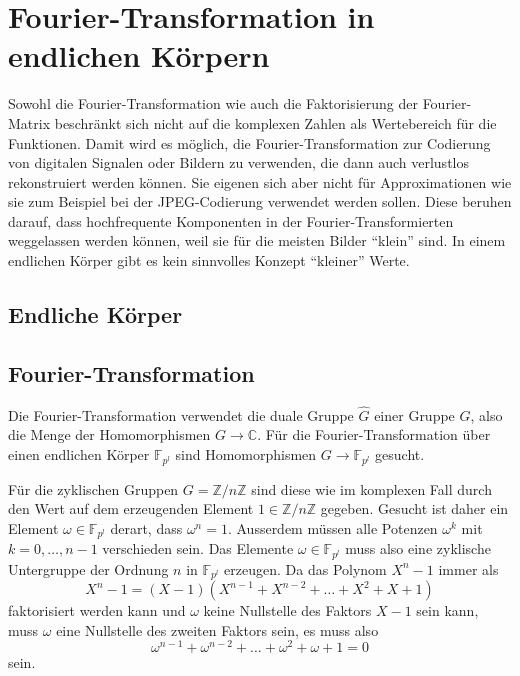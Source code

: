 %
%
%
\section{Fourier-Transformation in endlichen Körpern
\label{buch:diskret:section:koerper}}
Sowohl die Fourier-Transformation wie auch die Faktorisierung
der Fourier-Matrix beschränkt sich nicht auf die komplexen Zahlen
als Wertebereich für die Funktionen.
Damit wird es möglich, die Fourier-Transformation zur Codierung von
digitalen Signalen oder Bildern zu verwenden, die dann auch verlustlos
rekonstruiert werden können.
Sie eigenen sich aber nicht für Approximationen wie sie zum Beispiel
bei der JPEG-Codierung verwendet werden sollen.
Diese beruhen darauf, dass hochfrequente Komponenten in der
Fourier-Transformierten weggelassen werden können, weil sie für die
meisten Bilder ``klein'' sind.
In einem endlichen Körper gibt es kein sinnvolles Konzept ``kleiner''
Werte.

%
%
\subsection{Endliche Körper
\label{buch:diskret:koerper:subsection:koerper}}

%
%
\subsection{Fourier-Transformation
\label{buch:diskret:koeper:subsection:fourier}}
Die Fourier-Transformation verwendet die duale Gruppe $\hat{G}$ einer
Gruppe $G$, also die Menge der Homomorphismen $G\to \mathbb{C}$.
Für die Fourier-Transformation über einen endlichen Körper
$\mathbb{F}_{p^l}$ sind Homomorphismen
\(
G \to \mathbb{F}_{p^l}
\)
gesucht.

Für die zyklischen Gruppen $G=\mathbb{Z}/n\mathbb{Z}$ sind diese wie
im komplexen Fall durch den Wert auf dem erzeugenden Element
$1\in\mathbb{Z}/n\mathbb{Z}$ gegeben.
Gesucht ist daher ein Element $\omega\in\mathbb{F}_{p^l}$ derart,
dass $\omega^n=1$.
Ausserdem müssen alle Potenzen $\omega^k$ mit $k=0,\dots,n-1$
verschieden sein.
Das Elemente $\omega\in\mathbb{F}_{p^l}$ muss also eine
zyklische Untergruppe der Ordnung $n$ in $\mathbb{F}_{p^l}$ 
erzeugen.
Da das Polynom $X^n-1$ immer als
\[
X^n-1
=
(X-1)(X^{n-1}+X^{n-2}+\dots+X^2+X+1)
\]
faktorisiert werden kann und $\omega$ keine Nullstelle des Faktors
$X-1$ sein kann, muss $\omega$ eine Nullstelle des zweiten Faktors sein,
es muss also
\begin{equation}
\omega^{n-1}+\omega^{n-2}+\dots+\omega^2 + \omega + 1 = 0
\label{buch:diskret:koerper:eqn:summeomega}
\end{equation}
sein.


